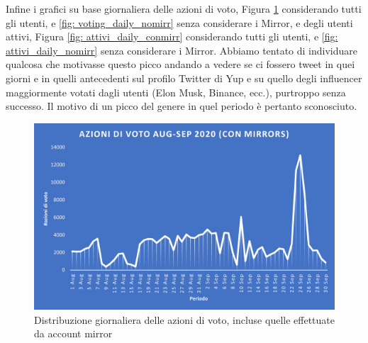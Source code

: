 Infine i grafici su base giornaliera delle azioni di voto, Figura \ref{fig: voting_daily_conmirr} considerando tutti gli utenti, e \ref{fig: voting_daily_nomirr} senza considerare i Mirror, e degli utenti attivi, Figura \ref{fig: attivi_daily_conmirr} considerando tutti gli utenti, e \ref{fig: attivi_daily_nomirr} senza considerare i Mirror.
Abbiamo tentato di individuare qualcosa che motivasse questo picco andando a vedere se ci fossero tweet in quei giorni e in quelli antecedenti sul profilo Twitter di Yup e su quello degli influencer maggiormente votati dagli utenti (Elon Musk, Binance, ecc.), purtroppo senza successo. Il motivo di un picco del genere in quel periodo è pertanto sconosciuto.

\begin{figure}[t]
    \centering
    \includegraphics[width=.7\textwidth]{graphs/daily_azionivoto.png}
    \caption{Distribuzione giornaliera delle azioni di voto, incluse quelle effettuate da account mirror}
    \label{fig: voting_daily_conmirr}
\end{figure}    
    
